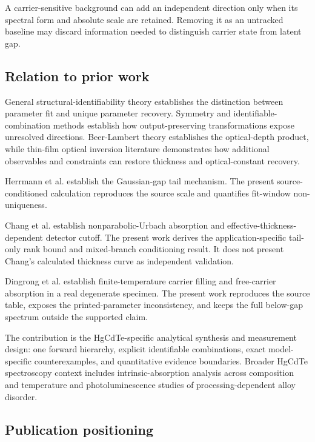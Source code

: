\documentclass[12pt]{article}
\begin{document}
A carrier-sensitive background can add an independent direction only when its spectral form and absolute scale are retained. Removing it as an untracked baseline may discard information needed to distinguish carrier state from latent gap.

\subsection{Relation to prior work}

General structural-identifiability theory establishes the distinction between parameter fit and unique parameter recovery. Symmetry and identifiable-combination methods establish how output-preserving transformations expose unresolved directions. Beer-Lambert theory establishes the optical-depth product, while thin-film optical inversion literature demonstrates how additional observables and constraints can restore thickness and optical-constant recovery.

Herrmann et al. establish the Gaussian-gap tail mechanism. The present source-conditioned calculation reproduces the source scale and quantifies fit-window non-uniqueness.

Chang et al. establish nonparabolic-Urbach absorption and effective-thickness-dependent detector cutoff. The present work derives the application-specific tail-only rank bound and mixed-branch conditioning result. It does not present Chang's calculated thickness curve as independent validation.

Dingrong et al. establish finite-temperature carrier filling and free-carrier absorption in a real degenerate specimen. The present work reproduces the source table, exposes the printed-parameter inconsistency, and keeps the full below-gap spectrum outside the supported claim.

The contribution is the HgCdTe-specific analytical synthesis and measurement design: one forward hierarchy, explicit identifiable combinations, exact model-specific counterexamples, and quantitative evidence boundaries. Broader HgCdTe spectroscopy context includes intrinsic-absorption analysis across composition and temperature and photoluminescence studies of processing-dependent alloy disorder. \cite{chu_mi_tang_1991,ivanov_omskii_2009}

\subsection{Publication positioning}
\end{document}
